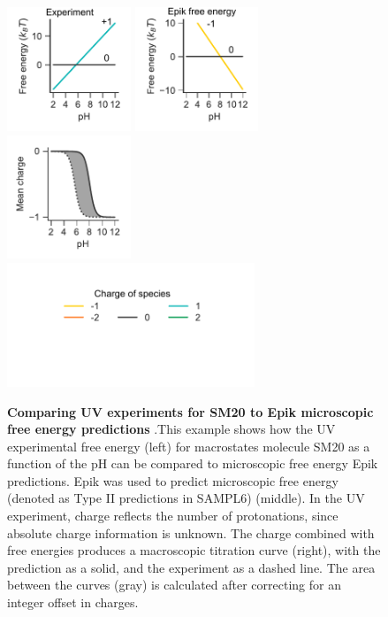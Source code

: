 \documentclass[9pt,lineno,final]{elife}
\begin{document}
\begin{figure}[H]
{	\label{fig:epiki-prediction}}
\end{figure}

\begin{figure}[H]
	\centering
	\includegraphics[width=0.33\textwidth]{Reports/Experiment-free-energy-SM20-titled.pdf}
	\includegraphics[width=0.33\textwidth]{Reports/Epik-TypeII-free-energy-SM20-titled.pdf}
	\includegraphics[width=0.33\textwidth]{Reports/Epik-TypeII-virtual-titration-SM20.pdf}\\
	\includegraphics[width=0.66\textwidth, trim={0 2cm 0 1cm},clip]{Reports/overview-charge-legend-2.pdf}
		\caption{{\bf Comparing UV experiments for SM20 to Epik microscopic free energy predictions} .This example shows how the UV experimental free energy (left) for macrostates molecule SM20 as a function of the pH can be compared to microscopic free energy Epik predictions. Epik was used to predict microscopic free energy (denoted as Type II predictions in SAMPL6) (middle). In the UV experiment, charge reflects the number of protonations, since absolute charge information is unknown. The charge combined with free energies produces a macroscopic titration curve (right), with the prediction as a solid, and the experiment as a dashed line. The area between the curves (gray) is calculated after correcting for an integer offset in charges.  
	\label{fig:epikii-prediction}}
\end{figure}
\end{document}
